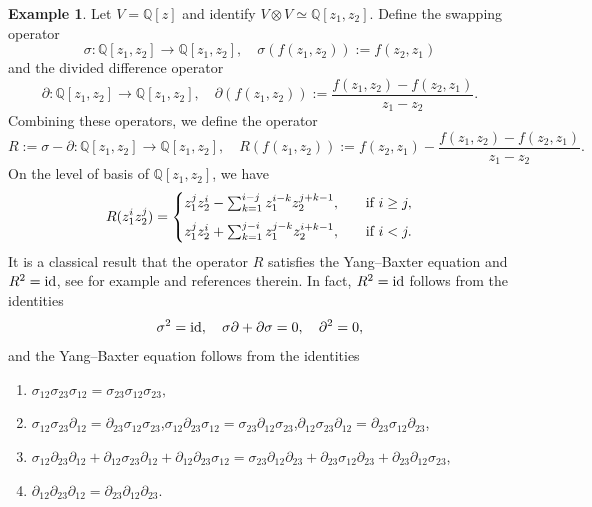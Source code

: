 \documentclass[10pt]{amsart}
\newcommand{\BQ}{\mathbb{Q}}
\newcommand{\id}{\textnormal{id}}
\newcommand{\+}{{}^+}
\theoremstyle{definition}
\newtheorem {example}[theorem]{Example}
\theoremstyle {definition}
\theoremstyle {definition}
\def\verticaldistance{6pt}
\begin{document}
\begin{example}\label{ex: YB classical}
Let $V=\BQ[z]$ and identify $V\otimes V\simeq \BQ[z_1,z_2]$. Define the swapping operator
$$\sigma:\BQ[z_1,z_2]\rightarrow \BQ[z_1,z_2],\quad \sigma(f(z_1,z_2)):=f(z_2,z_1)
$$
and the divided difference operator
$$\partial:\BQ[z_1,z_2]\rightarrow \BQ[z_1,z_2],\quad \partial(f(z_1,z_2)):=\frac{f(z_1,z_2)-f(z_2,z_1)}{z_1-z_2}. 
$$
Combining these operators, we define the operator
$$R:=\sigma-\partial:\BQ[z_1,z_2]\rightarrow \BQ[z_1,z_2],\quad R(f(z_1,z_2)):=f(z_2,z_1)-\frac{f(z_1,z_2)-f(z_2,z_1)}{z_1-z_2}. 
$$
On the level of basis of $\BQ[z_1,z_2]$, we have 
$$R(z_1^iz_2^j)=\begin{cases}
z_1^jz_2^i-\sum_{k=1}^{i-j}z_1^{i-k}z_2^{j+k-1},&\quad\textnormal{if}\ i\geq j,\\[\verticaldistance]
z_1^jz_2^i+\sum_{k=1}^{j-i}z_1^{j-k}z_2^{i+k-1},&\quad\textnormal{if}\ i<j.\\
\end{cases}
$$
It is a classical result that the operator $R$ satisfies the Yang--Baxter equation and $R^2=\id$, see for example \cite{LLT} and references therein. In fact, $R^2=\id$ follows from the identities 
\begin{equation}\label{eq: square identity}
    \sigma^2=\id,\quad \sigma\partial+\partial \sigma=0,\quad \partial^2=0,
\end{equation}
and the Yang--Baxter equation follows from the identities
\begin{enumerate}
    \item [YB-0)] $\sigma_{12}\sigma_{23}\sigma_{12}=\sigma_{23}\sigma_{12}\sigma_{23},$
    \item [YB-1)] $\sigma_{12}\sigma_{23}\partial_{12}=\partial_{23}\sigma_{12}\sigma_{23}$,\quad $\sigma_{12}\partial_{23}\sigma_{12}=\sigma_{23}\partial_{12}\sigma_{23}$,\quad  $\partial_{12}\sigma_{23}\partial_{12}=\partial_{23}\sigma_{12}\partial_{23}$,
    \item [YB-2)] $\sigma_{12}\partial_{23}\partial_{12}+\partial_{12}\sigma_{23}\partial_{12}+\partial_{12}\partial_{23}\sigma_{12}
=\sigma_{23}\partial_{12}\partial_{23}+\partial_{23}\sigma_{12}\partial_{23}+\partial_{23}\partial_{12}\sigma_{23}$,
    \item [YB-3)] $\partial_{12}\partial_{23}\partial_{12}=\partial_{23}\partial_{12}\partial_{23}$.
\end{enumerate}


\end{example}
\end{document}

